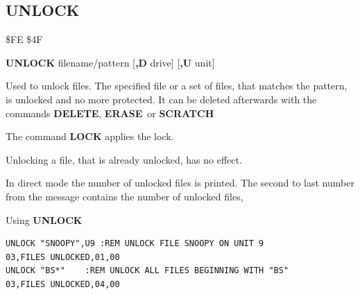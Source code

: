 \subsection{UNLOCK}
\begin{description}[leftmargin=2cm,style=nextline]
\item [Token:] \$FE \$4F
\item [Format:] {\bf UNLOCK} filename/pattern [{\bf,D} drive] [{\bf,U} unit]
\item [Usage:] Used to unlock files. The specified file or
               a set of files, that matches the pattern, is unlocked
               and no more protected.
               It can be deleted afterwards with the commands {\bf DELETE},
               {\bf ERASE} or {\bf SCRATCH}

               The command {\bf LOCK} applies the lock.

   \filenamedefinition

   \drivedefinition

   \unitdefinition

\item [Remarks:] Unlocking a file, that is already unlocked,
                 has no effect.

   In direct mode the number of unlocked files is printed.
                 The second to last number from the message
                 contains the number of unlocked files,

\item [Examples:] Using {\bf UNLOCK}
\begin{tcolorbox}[colback=black,coltext=white]
\verbatimfont{\codefont}
\begin{verbatim}
UNLOCK "SNOOPY",U9 :REM UNLOCK FILE SNOOPY ON UNIT 9
03,FILES UNLOCKED,01,00
UNLOCK "BS*"    :REM UNLOCK ALL FILES BEGINNING WITH "BS"
03,FILES UNLOCKED,04,00
\end{verbatim}
\end{tcolorbox}
\end{description}


\newpage
